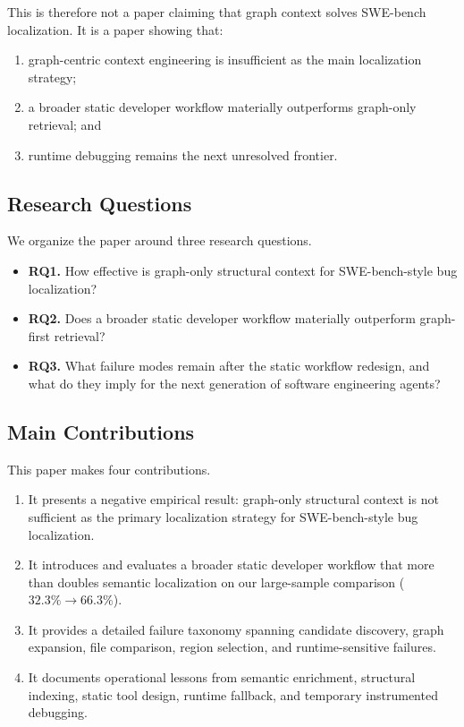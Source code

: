 \documentclass[11pt]{article}
\begin{document}
This is therefore not a paper claiming that graph context solves SWE-bench localization. It is a paper showing that:

\begin{enumerate}
\item graph-centric context engineering is insufficient as the main localization strategy;
\item a broader static developer workflow materially outperforms graph-only retrieval; and
\item runtime debugging remains the next unresolved frontier.
\end{enumerate}

\subsection{Research Questions}

We organize the paper around three research questions.

\begin{itemize}
\item \textbf{RQ1.} How effective is graph-only structural context for SWE-bench-style bug localization?
\item \textbf{RQ2.} Does a broader static developer workflow materially outperform graph-first retrieval?
\item \textbf{RQ3.} What failure modes remain after the static workflow redesign, and what do they imply for the next generation of software engineering agents?
\end{itemize}

\subsection{Main Contributions}

This paper makes four contributions.

\begin{enumerate}
\item It presents a negative empirical result: graph-only structural context is not sufficient as the primary localization strategy for SWE-bench-style bug localization.
\item It introduces and evaluates a broader static developer workflow that more than doubles semantic localization on our large-sample comparison ($32.3\% \rightarrow 66.3\%$).
\item It provides a detailed failure taxonomy spanning candidate discovery, graph expansion, file comparison, region selection, and runtime-sensitive failures.
\item It documents operational lessons from semantic enrichment, structural indexing, static tool design, runtime fallback, and temporary instrumented debugging.
\end{enumerate}
\end{document}
